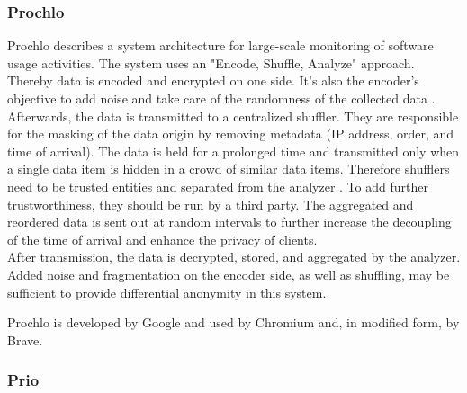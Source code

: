     \subsubsection{Prochlo}
        Prochlo describes a system architecture for large-scale monitoring of software usage activities. The system uses an "Encode, Shuffle, Analyze" approach. Thereby data is encoded and encrypted on one side. It's also the encoder's objective to add noise and take care of the randomness of the collected data \cite{bittau_prochlo_2017}.\\
        Afterwards, the data is transmitted to a centralized shuffler. They are responsible for the masking of the data origin by removing metadata (IP address, order, and time of arrival).
        The data is held for a prolonged time and transmitted only when a single data item is hidden in a crowd of similar data items. Therefore shufflers need to be trusted entities and separated from the analyzer \cite{bittau_prochlo_2017}. To add further trustworthiness, they should be run by a third party. The aggregated and reordered data is sent out at random intervals to further increase the decoupling of the time of arrival and enhance the privacy of clients.\\
        After transmission, the data is decrypted, stored, and aggregated by the analyzer. 
        Added noise and fragmentation on the encoder side, as well as shuffling, may be sufficient to provide differential anonymity in this system.
        
        Prochlo is developed by Google and used by Chromium and, in modified form, by Brave.
    
    \subsubsection{Prio}

